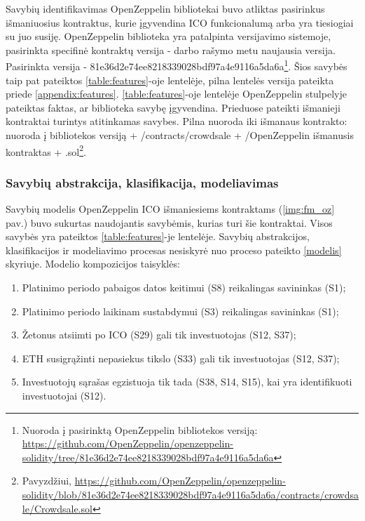 \documentclass{VUMIFPSbakalaurinis}
\begin{document}
Savybių identifikavimas OpenZeppelin bibliotekai buvo atliktas pasirinkus išmaniuosius kontraktus, kurie įgyvendina ICO funkcionalumą arba yra tiesiogiai su juo susiję. OpenZeppelin biblioteka yra patalpinta versijavimo sistemoje, pasirinkta specifinė kontraktų versija - darbo rašymo metu naujausia versija. Pasirinkta versija - 81e36d2e74ee8218339028bdf97a4e9116a5da6a\footnote{Nuoroda į pasirinktą OpenZeppelin bibliotekos versiją: \url{https://github.com/OpenZeppelin/openzeppelin-solidity/tree/81e36d2e74ee8218339028bdf97a4e9116a5da6a}}. Šios savybės taip pat pateiktos \ref{table:features}-oje lentelėje, pilna lentelės versija pateikta priede \ref{appendix:features}. \ref{table:features}-oje lentelėje OpenZeppelin stulpelyje pateiktas faktas, ar biblioteka savybę įgyvendina. Prieduose pateikti išmanieji kontraktai turintys atitinkamas savybes. Pilna nuoroda iki išmanaus kontrakto: nuoroda į bibliotekos versiją + /contracts/crowdsale + /OpenZeppelin išmanusis kontraktas + .sol\footnote{Pavyzdžiui, \url{https://github.com/OpenZeppelin/openzeppelin-solidity/blob/81e36d2e74ee8218339028bdf97a4e9116a5da6a/contracts/crowdsale/Crowdsale.sol}}.

\subsubsection{Savybių abstrakcija, klasifikacija, modeliavimas}

Savybių modelis OpenZeppelin ICO išmaniesiems kontraktams (\ref{img:fm_oz} pav.) buvo sukurtas naudojantis savybėmis, kurias turi šie kontraktai. Visos savybės yra pateiktos \ref{table:features}-je lentelėje. Savybių abstrakcijos, klasifikacijos ir modeliavimo procesas nesiskyrė nuo proceso pateikto \ref{modelis} skyriuje. Modelio kompozicijos taisyklės:
\begin{enumerate}[topsep=0pt,itemsep=-1ex,partopsep=1ex,parsep=1ex]
\item Platinimo periodo pabaigos datos keitimui (S8) reikalingas savininkas (S1);
\item Platinimo periodo laikinam sustabdymui (S3) reikalingas savininkas (S1);
\item Žetonus atsiimti po ICO (S29) gali tik investuotojas (S12, S37);
\item ETH susigrąžinti nepasiekus tikslo (S33) gali tik investuotojas (S12, S37);
\item Investuotojų sąrašas egzistuoja tik tada (S38, S14, S15), kai yra identifikuoti investuotojai (S12).
\end{enumerate}
\pagebreak
\end{document}
